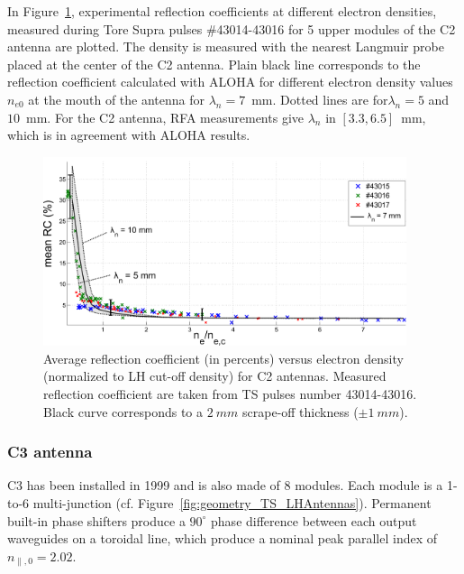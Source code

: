 In Figure~\ref{fig:MarkI_mean_RC}, experimental reflection coefficients at different electron densities, measured during Tore Supra pulses \#43014-43016 for 5 upper modules of the C2 antenna are plotted. The density is measured with the nearest Langmuir probe placed at the center of the C2 antenna. Plain black line corresponds to the reflection coefficient calculated with ALOHA for different electron density values $n_{e0}$ at the mouth of the antenna for $\lambda_n=7$~mm. Dotted lines are for$\lambda_n=5$ and $10$~mm. For the C2 antenna, RFA measurements give $\lambda_n$ in $[3.3, 6.5]$~mm, which is in agreement with ALOHA results. 

\begin{figure}[h]
	\centering
	\includegraphics[width=0.95\textwidth]{figures/chap2/Tore_Supra/C2_mean_CR_modBas}
	\caption{Average reflection  coefficient (in percents) versus electron density (normalized to LH cut-off density) for C2 antennas. Measured reflection  coefficient are taken from TS pulses number 43014-43016. Black curve corresponds to a $2~mm$ scrape-off thickness ($\pm 1~mm$).}
	\label{fig:MarkI_mean_RC}
\end{figure}

\subsubsection{C3 antenna}
C3 has been installed in 1999 and is also made of 8 modules. Each module is a 1-to-6 multi-junction (cf. Figure~\ref{fig:geometry_TS_LHAntennas}). Permanent built-in phase shifters produce a $90^\circ$ phase difference between each output waveguides on a toroidal line, which produce a nominal peak parallel index of $n_{\parallel,0}=2.02$.

